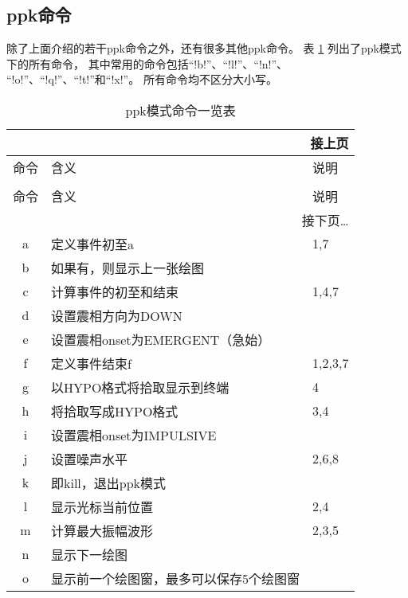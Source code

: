 \subsection{ppk命令}
除了上面介绍的若干ppk命令之外，还有很多其他ppk命令。
表 \ref{table:plotpk-commands} 列出了ppk模式下的所有命令，
其中常用的命令包括``!b!''、``!l!''、``!n!''、
``!o!''、``!q!''、``!t!''和``!x!''。
所有命令均不区分大小写。

\begin{center}
\small\ttfamily
\begin{longtable}{cll}
\multicolumn{3}{r}{接上页} \\
\toprule
命令    &   含义    &   说明    \\
\midrule
\endhead
\caption{ppk模式命令一览表} \label{table:plotpk-commands}   \\
\toprule
命令    &   含义    &   说明    \\
\midrule
\endfirsthead
\bottomrule
\multicolumn{3}{r}{接下页\dots} \\
\endfoot
\bottomrule
\endlastfoot
a       &   定义事件初至a                           &   1,7     \\
b       &   如果有，则显示上一张绘图                &           \\
c       &   计算事件的初至和结束                    &   1,4,7   \\
d       &   设置震相方向为DOWN                      &           \\
e       &   设置震相onset为EMERGENT（急始）         &           \\
f       &   定义事件结束f                           &  1,2,3,7  \\
g       &   以HYPO格式将拾取显示到终端              &   4       \\
h       &   将拾取写成HYPO格式                      &   3,4     \\
i       &   设置震相onset为IMPULSIVE                &           \\
j       &   设置噪声水平                            &   2,6,8   \\
k       &   即kill，退出ppk模式                     &           \\
l       &   显示光标当前位置                        &   2,4     \\
m       &   计算最大振幅波形                        &   2,3,5   \\
n       &   显示下一绘图                            &           \\
o       &   显示前一个绘图窗，最多可以保存5个绘图窗 &           \\

\end{longtable}
\end{center}
